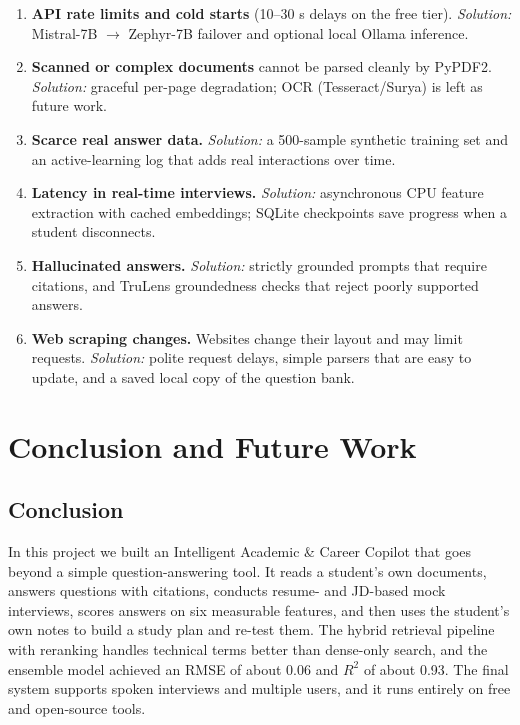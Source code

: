 \documentclass[11pt,a4paper]{report}
\begin{document}
\begin{enumerate}
  \item \textbf{API rate limits and cold starts} (10--30 s delays on the free tier). \emph{Solution:} Mistral-7B $\rightarrow$ Zephyr-7B failover and optional local Ollama inference.
  \item \textbf{Scanned or complex documents} cannot be parsed cleanly by PyPDF2. \emph{Solution:} graceful per-page degradation; OCR (Tesseract/Surya) is left as future work.
  \item \textbf{Scarce real answer data.} \emph{Solution:} a 500-sample synthetic training set and an active-learning log that adds real interactions over time.
  \item \textbf{Latency in real-time interviews.} \emph{Solution:} asynchronous CPU feature extraction with cached embeddings; SQLite checkpoints save progress when a student disconnects.
  \item \textbf{Hallucinated answers.} \emph{Solution:} strictly grounded prompts that require citations, and TruLens groundedness checks that reject poorly supported answers.
  \item \textbf{Web scraping changes.} Websites change their layout and may limit requests. \emph{Solution:} polite request delays, simple parsers that are easy to update, and a saved local copy of the question bank.
\end{enumerate}

\chapter{Conclusion and Future Work}

\section{Conclusion}

In this project we built an Intelligent Academic \& Career Copilot that goes beyond a simple question-answering tool. It reads a student's own documents, answers questions with citations, conducts resume- and JD-based mock interviews, scores answers on six measurable features, and then uses the student's own notes to build a study plan and re-test them. The hybrid retrieval pipeline with reranking handles technical terms better than dense-only search, and the ensemble model achieved an RMSE of about 0.06 and $R^2$ of about 0.93. The final system supports spoken interviews and multiple users, and it runs entirely on free and open-source tools.
\end{document}
